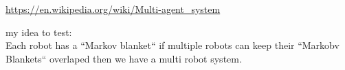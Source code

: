 \documentclass[a4paper]{article}
\title{}
\date{}
\begin{document}
    \maketitle
    \url{https://en.wikipedia.org/wiki/Multi-agent_system}
    
    my idea to test:\\
    Each robot has a ``Markov blanket`` if multiple robots can keep their ``Markobv Blankets`` overlaped then we have a multi robot system.
\end{document}

